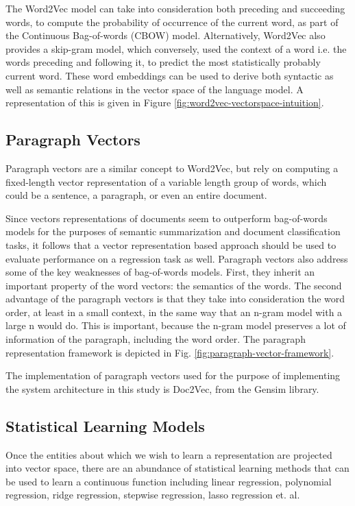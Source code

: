 \documentclass[conference]{IEEEtran}
\begin{document}
        The Word2Vec model\cite{mikolov2013efficient} can take into consideration both preceding and succeeding words, to compute the probability of occurrence of the current word, as part of the Continuous Bag-of-words (CBOW) model. Alternatively, Word2Vec also provides a skip-gram model\cite{mikolov2013distributed}, which conversely, used the context of a word i.e. the words preceding and following it, to predict the most statistically probably current word. These word embeddings can be used to derive both syntactic as well as semantic relations in the vector space of the language model. A representation of this is given in Figure \ref{fig:word2vec-vectorspace-intuition}.

    \subsection{Paragraph Vectors}
        Paragraph vectors are a similar concept to Word2Vec, but rely on computing a fixed-length vector representation of a variable length group of words, which could be a sentence, a paragraph, or even an entire document.

        Since vectors representations of documents seem to outperform bag-of-words models for the purposes of semantic summarization and document classification tasks, it follows that a vector representation based approach should be used to evaluate performance on a regression task as well. Paragraph vectors also address some of the key weaknesses of bag-of-words models. First, they inherit an important property of the word vectors: the semantics of the words. The second advantage of the paragraph vectors is that they take into consideration the word order, at least in a small context, in the same way that an n-gram model with a large n would do. This is important, because the n-gram model preserves a lot of information of the paragraph, including the word order\cite{le2014distributed}. The paragraph representation framework is depicted in Fig. \ref{fig:paragraph-vector-framework}.

        The implementation of paragraph vectors used for the purpose of implementing the system architecture in this study is Doc2Vec, from the Gensim library\cite{doc2vec_api}.


    \subsection{Statistical Learning Models}
        Once the entities about which we wish to learn a representation are projected into vector space, there are an abundance of statistical learning methods that can be used to learn a continuous function including linear regression, polynomial regression, ridge regression, stepwise regression, lasso regression et. al.
\end{document}
